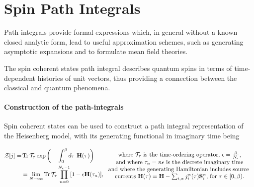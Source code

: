 \documentclass{homework}
\begin{document}
\clearpage

\section{\textbf{Spin Path Integrals}}

Path integrals provide formal expressions which, in general without a known closed analytic form, lead to useful approximation schemes, such as generating asymptotic expansions and to formulate mean field theories. 

The spin coherent states path integral describes quantum spins in terms of time-dependent histories of unit vectors, thus providing a connection between the classical and quantum phenomena. \\

\paragraph{Construction of the path-integrals}

Spin coherent states can be used to construct a path integral representation of the Heisenberg model, with its generating functional in imaginary time being 

\begin{equation}
\begin{split}
    \mathcal{Z}[j] =& \Tr \mathcal{T}_{\tau} \exp \bigg(-\int_{0}^\beta d\tau \textnormal{ } {\bf H}(\tau)\bigg)  \\
    &= \lim_{N \rightarrow \infty} \Tr \mathcal{T}_{\tau} \prod_{n=0}^{N_{\epsilon} - 1} [1-\epsilon {\bf H}(\tau_n)],
\end{split} \begin{array}{cc}
         \textnormal{ where $\mathcal{T}_\tau$ is the time-ordering operator, $\epsilon = \frac{\beta}{N_{\epsilon}}$,}  \\
         \textnormal{  and where $\tau_n = n \epsilon$ is the discrete imaginary time} \\
         \textnormal{ and where the generating Hamiltonian includes source } \\
         \textnormal{ currents ${\bf H}(\tau) = {\bf H} - \sum_{i, \alpha} j_i^\alpha(\tau) {\bf S}_i^\alpha$, for $\tau \in [0, \beta).$}
    \end{array}
\end{equation}
\end{document}
